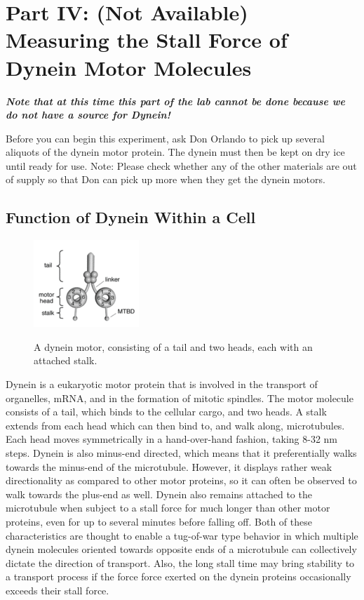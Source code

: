 \documentclass{../lab}
\begin{document}
\section{Part IV: (Not Available) Measuring the Stall Force of Dynein Motor Molecules}

\emph{\textbf{Note that at this time this part of the lab cannot be done because we do not have a source for Dynein!}}

Before you can begin this experiment, ask Don Orlando to pick up several aliquots of the dynein motor protein. The dynein must then be kept on dry ice until ready for use.  Note: Please check whether any of the other materials are out of supply so that Don can pick up more when they get the dynein motors.

\subsection{Function of Dynein Within a Cell}


\begin{figure}[h]
    \centering
    \href{http://experimentationlab.berkeley.edu/sites/default/files/images/150px-Dynein_Motor.gif}{\includegraphics[width=0.5\linewidth]{images/150px-Dynein_Motor.png}}
    \caption{A dynein motor, consisting of a tail and two heads, each with an attached stalk.}
    \label{fig:150px-Dynein_Motor}
\end{figure}

Dynein is a eukaryotic motor protein that is involved in the transport of organelles, mRNA, and in the formation of mitotic spindles. The motor molecule consists of a tail, which binds to the cellular cargo, and two heads. A stalk extends from each head which can then bind to, and walk along, microtubules. Each head moves symmetrically in a hand-over-hand fashion, taking 8-32 nm steps. Dynein is also minus-end directed, which means that it preferentially walks towards the minus-end of the microtubule. However, it displays rather weak directionality as compared to other motor proteins, so it can often be observed to walk towards the plus-end as well. Dynein also remains attached to the microtubule when subject to a stall force for much longer than other motor proteins, even for up to several minutes before falling off. Both of these characteristics are thought to enable a tug-of-war type behavior in which multiple dynein molecules oriented towards opposite ends of a microtubule can collectively dictate the direction of transport. Also, the long stall time may bring stability to a transport process if the force force exerted on the dynein proteins occasionally exceeds their stall force.
\end{document}
